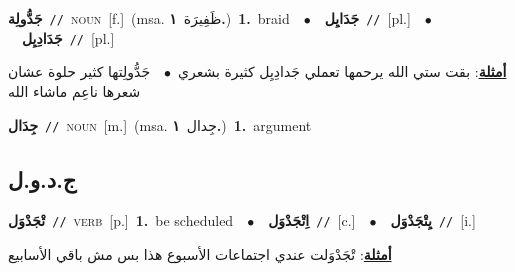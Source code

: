 \documentclass[10pt,a4paper,twoside]{article} %
\begin{document}
\begin{multicols}{2}
{\setlength\topsep{0pt}\textbf{\foreignlanguage{arabic}{جَدُّولِة}}\ {\color{gray}\texttt{//}\color{black}}\ \textsc{noun}\ [f.]\ \color{gray}(msa. \foreignlanguage{arabic}{ظَفِيرَة}~\foreignlanguage{arabic}{\textbf{١.}})\color{black}\ \textbf{1.}~braid\ \ $\bullet$\ \ \setlength\topsep{0pt}\textbf{\foreignlanguage{arabic}{جَدَايِل}}\ {\color{gray}\texttt{//}\color{black}}\ [pl.]\ \ $\bullet$\ \ \setlength\topsep{0pt}\textbf{\foreignlanguage{arabic}{جَدَادِيِل}}\ {\color{gray}\texttt{//}\color{black}}\ [pl.]\  \begin{flushright}\color{gray}\foreignlanguage{arabic}{\textbf{\underline{\foreignlanguage{arabic}{أمثلة}}}: بقت ستي الله يرحمها تعملي جَدادِيِل كثيرة بشعري\ $\bullet$\ \  جَدُّولِتها كثير حلوة عشان شعرها ناعِم ماشاء الله}\end{flushright}\color{black}} \vspace{2mm}

{\setlength\topsep{0pt}\textbf{\foreignlanguage{arabic}{جِدَال}}\ {\color{gray}\texttt{//}\color{black}}\ \textsc{noun}\ [m.]\ \color{gray}(msa. \foreignlanguage{arabic}{جِدال}~\foreignlanguage{arabic}{\textbf{١.}})\color{black}\ \textbf{1.}~argument\ } \vspace{2mm}

\vspace{-3mm}
\subsection*{\color{blue}\foreignlanguage{arabic}{ج.د.و.ل}\color{blue}{}} 

{\setlength\topsep{0pt}\textbf{\foreignlanguage{arabic}{تْجَدْوَل}}\ {\color{gray}\texttt{//}\color{black}}\ \textsc{verb}\ [p.]\ \textbf{1.}~be scheduled\ \ $\bullet$\ \ \setlength\topsep{0pt}\textbf{\foreignlanguage{arabic}{اِتْجَدْوَل}}\ {\color{gray}\texttt{//}\color{black}}\ [c.]\ \ $\bullet$\ \ \setlength\topsep{0pt}\textbf{\foreignlanguage{arabic}{يِتْجَدْوَل}}\ {\color{gray}\texttt{//}\color{black}}\ [i.]\  \begin{flushright}\color{gray}\foreignlanguage{arabic}{\textbf{\underline{\foreignlanguage{arabic}{أمثلة}}}: تْجَدْوَلت عندي اجتماعات الأسبوع هذا بس مش باقي الأسابيع}\end{flushright}\color{black}} \vspace{2mm}


\end{multicols}
\end{document}
